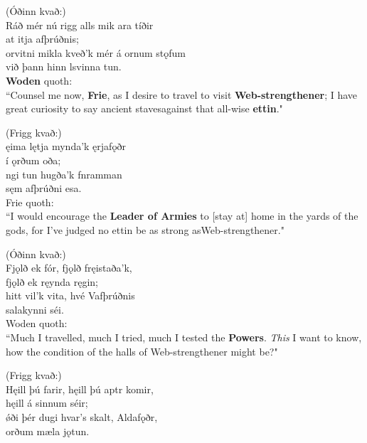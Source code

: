 
(Óðinn kvað:) \\%
\bva Ráð mér nú rigg \hld alls mik ara tíðir \\%
at itja afþrúðnis; \\%
orvitni mikla \hld kveð'k mér á ornum stǫfum \\%
við þann hinn lsvinna tun.\\%

\bvb \textbf{Woden} quoth: \\ “Counsel me now, \textbf{Frie}, as I desire to travel to visit \textbf{Web-strengthener}; I have great curiosity to say ancient staves\footnotemark[1] against that all-wise \textbf{ettin}." \\

(Frigg kvað:) \\%
\bva {}ęima lętja \hld mynda'k ęrjafǫðr \\%
í ǫrðum oða; \\%
ngi tun \hld hugða'k fnramman \\%
sęm afþrúðni esa.\\%

\bvb Frie quoth: \\ “I would encourage the \textbf{Leader of Armies} to [stay at] home in the yards of the gods, for I've judged no ettin be as strong as\footnotemark[3] Web-strengthener." \\

(Óðinn kvað:) \\%
\bva Fjǫlð ek fór, \hld fjǫlð fręistaða'k, \\%
fjǫlð ek ręynda ręgin; \\%
hitt vil'k vita, \hld hvé Vafþrúðnis \\%
salakynni séi.\\%

\bvb Woden quoth: \\ “Much I travelled, much I tried, much I tested the \textbf{Powers}\footnotemark[4]. \emph{This} I want to know, how the condition of the halls of Web-strengthener might be?" \\

(Frigg kvað:) \\%
\bva Hęill þú farir, \hld hęill þú aptr komir, \\%
hęill á sinnum séir; \\%
ǿði þér dugi \hld hvar's skalt, Aldafǫðr, \\%
orðum mæla jǫtun.\\%

